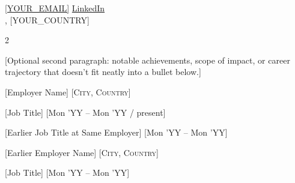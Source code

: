 \documentclass[10pt,a4paper]{article}
\begin{document}


\noindent\href{mailto:[YOUR_EMAIL]}{[YOUR_EMAIL]}\bull
\href{[YOUR_LINKEDIN_URL]}{LinkedIn}\\
[YOUR_CITY], [YOUR_COUNTRY]

\spacedhrule{0.9em}{-0.4em}



\vspace{-1.3em}

\begin{multicols}{2}

[Optional second paragraph: notable achievements, scope of impact, or career trajectory that doesn't fit neatly into a bullet below.]
\end{multicols}

\spacedhrule{0.5em}{-0.4em}



\headedsection
{[Employer Name]}
{\textsc{[City, Country]}} {

\headedsubsection
{[Job Title]}
{[Mon 'YY -- Mon 'YY / present]}
{}

\headedsubsection
{[Earlier Job Title at Same Employer]}
{[Mon 'YY -- Mon 'YY]}
{}
}


\headedsection
{[Earlier Employer Name]}
{\textsc{[City, Country]}} {

\headedsubsection
{[Job Title]}
{[Mon 'YY -- Mon 'YY]}
{}
}
\end{document}
